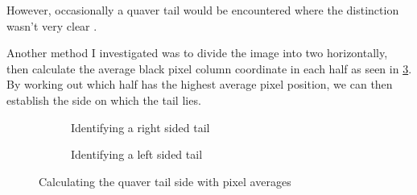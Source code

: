 However, occasionally a quaver tail would be encountered where the distinction wasn't very clear .

Another method I investigated was to divide the image into two horizontally, then calculate the average black pixel column coordinate in each half as seen in \cref{fig:quaver-tail-average-position}. By working out which half has the highest average pixel position, we can then establish the side on which the tail lies.

\begin{figure}[h!]
    \centering

    \begin{subfigure}[b]{.45\linewidth}
        \centering
      \caption{Identifying a right sided tail}
      \label{fig:quaver-tail-average-position-right}
    \end{subfigure}
    \begin{subfigure}[b]{.45\linewidth}
        \centering
      \caption{Identifying a left sided tail}
      \label{fig:quaver-tail-average-position-left}
    \end{subfigure}

      \caption{Calculating the quaver tail side with pixel averages}
      \label{fig:quaver-tail-average-position}
\end{figure}

